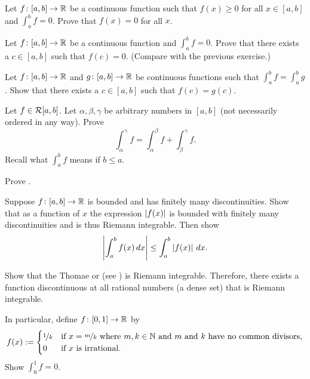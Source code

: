\begin{exercise}
Let $f \colon [a,b] \to {\mathbb{R}}$ be a continuous function such that $f(x) \geq 0$
for all $x \in [a,b]$ and $\int_a^b f = 0$.  Prove that $f(x) = 0$
for all $x$.
\end{exercise}

\begin{exercise}
Let $f \colon [a,b] \to {\mathbb{R}}$ be a continuous function
and $\int_a^b f = 0$.  Prove that
there exists a $c \in [a,b]$ such that $f(c) = 0$. (Compare with the
previous exercise.)
\end{exercise}

\begin{exercise}
Let $f \colon [a,b] \to {\mathbb{R}}$ and $g \colon [a,b] \to {\mathbb{R}}$
be continuous functions such that $\int_a^b f = \int_a^b g$.
Show that there exists a $c \in [a,b]$ such that $f(c) = g(c)$.
\end{exercise}

\begin{exercise}
Let $f \in {\mathcal{R}}[a,b]$.  Let $\alpha, \beta, \gamma$ be arbitrary numbers in
$[a,b]$ (not necessarily ordered in any way).  Prove 
\begin{equation*}
\int_\alpha^\gamma f =
\int_\alpha^\beta f +
\int_\beta^\gamma f .
\end{equation*}
Recall what $\int_a^b f$ means if $b \leq a$.
\end{exercise}

\begin{exercise}
Prove .
\end{exercise}

\begin{exercise} \label{exercise:easyabsint}
Suppose $f \colon [a,b] \to {\mathbb{R}}$ is bounded and
has finitely many discontinuities.
Show that as a function of $x$ the expression $\left\lvert {f(x)} \right\rvert$ is bounded with finitely many
discontinuities and is thus Riemann integrable.  Then show 
\begin{equation*}
\left\lvert {\int_a^b f(x)\,dx} \right\rvert \leq \int_a^b \left\lvert {f(x)} \right\rvert\,dx .
\end{equation*}
\end{exercise}

\begin{exercise}[Hard]
Show that the
Thomae or 
(see )
is Riemann integrable.  Therefore, there exists a
function discontinuous at all rational numbers (a dense set)
that is Riemann integrable.

In particular,
define $f \colon [0,1] \to {\mathbb{R}}$ by
\begin{equation*}
f(x) := 
\begin{cases}
\nicefrac{1}{k} & \text{if } x=\nicefrac{m}{k} \text{ where }
m,k \in {\mathbb{N}} \text{ and } m \text{ and } k \text{ have no common divisors,} \\
0               & \text{if } x \text{ is irrational.}
\end{cases}
\end{equation*}
Show $\int_0^1 f = 0$.
\end{exercise}


